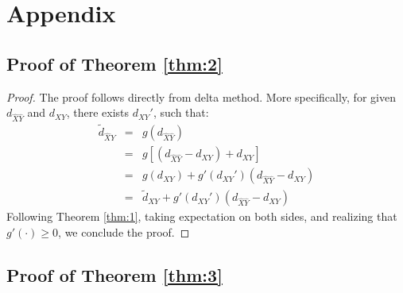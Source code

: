 \documentclass[12pt,letterpaper]{article}
\begin{document}
\appendix{}

\section{Appendix}
\label{sec:appendix}

\subsection{Proof of Theorem \ref{thm:2}}
\label{sec:proof-thm-2}



\begin{proof}
  The proof follows directly from delta method. More specifically, for
  given $d_{\hat{X}\hat{Y}}$ and $d_{XY}$, there exists $d_{XY}'$, such that: 
  \begin{eqnarray*}
    \tilde{d}_{\hat{X}\hat{Y}} &=& g(d_{\hat{X}\hat{Y}})\\
                               &=& g
                                   \left[
                                   (d_{\hat{X}\hat{Y}} - d_{XY}) + d_{XY}
                                   \right] \\
                               &=& g(d_{XY}) + g'(d_{XY}') (d_{\hat{X}\hat{Y}} - d_{XY})\\
                               &=& \tilde{d}_{XY} + g'(d_{XY}') (d_{\hat{X}\hat{Y}} - d_{XY})
  \end{eqnarray*}
  Following Theorem \ref{thm:1}, taking expectation on both sides, and
  realizing that $g'(\cdot) \ge 0$, we conclude the proof.
\end{proof}

\subsection{Proof of Theorem \ref{thm:3}}
\label{proof-thm-3}
\end{document}
